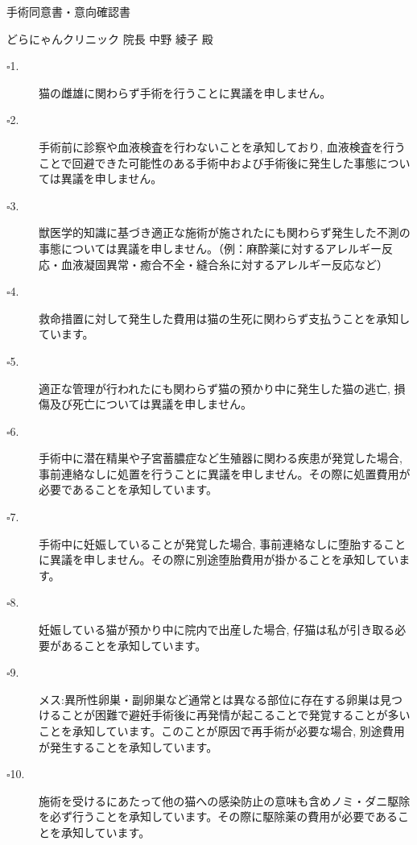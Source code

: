 \documentclass{jsarticle}
\begin{document}
\begin{center}
\Huge
\vspace{-100pt}
手術同意書・意向確認書
\end{center}

\vspace{10pt}
\Large
\noindent どらにゃんクリニック	院長	中野	綾子	殿

\vspace{10pt}
\large

\begin{description}
  \item[$\square$1.] 猫の雌雄に関わらず手術を行うことに異議を申しません。
  \item[$\square$2.] 手術前に診察や血液検査を行わないことを承知しており, 血液検査を行うことで回避できた可能性のある手術中および手術後に発生した事態については異議を申しません。
  \item[$\square$3.] 獣医学的知識に基づき適正な施術が施されたにも関わらず発生した不測の事態については異議を申しません。（例：麻酔薬に対するアレルギー反応・血液凝固異常・癒合不全・縫合糸に対するアレルギー反応など）
  \item[$\square$4.] 救命措置に対して発生した費用は猫の生死に関わらず支払うことを承知しています。
  \item[$\square$5.] 適正な管理が行われたにも関わらず猫の預かり中に発生した猫の逃亡, 損傷及び死亡については異議を申しません。
  \item[$\square$6.] 手術中に潜在精巣や子宮蓄膿症など生殖器に関わる疾患が発覚した場合, 事前連絡なしに処置を行うことに異議を申しません。その際に処置費用が必要であることを承知しています。
  \item[$\square$7.] 手術中に妊娠していることが発覚した場合, 事前連絡なしに堕胎することに異議を申しません。その際に別途堕胎費用が掛かることを承知しています。
  \item[$\square$8.] 妊娠している猫が預かり中に院内で出産した場合, 仔猫は私が引き取る必要があることを承知しています。
  \item[$\square$9.]メス:異所性卵巣・副卵巣など通常とは異なる部位に存在する卵巣は見つけることが困難で避妊手術後に再発情が起こることで発覚することが多いことを承知しています。このことが原因で再手術が必要な場合, 別途費用が発生することを承知しています。
  \item[$\square$10.]\hspace{-5pt}施術を受けるにあたって他の猫への感染防止の意味も含めノミ・ダニ駆除を必ず行うことを承知しています。その際に駆除薬の費用が必要であることを承知しています。
\end{description}
\vspace{20pt}
\end{document}
